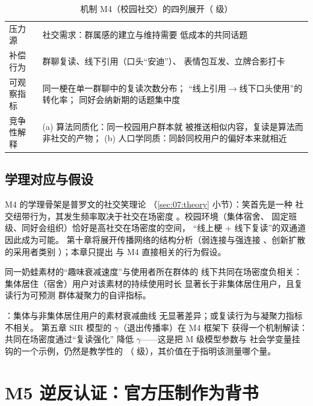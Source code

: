 \begin{table}[htbp]\centering
  \caption{机制 M4（校园社交）的四列展开（ 级）}
  \label{tab:07:m4}
  \small
  \begin{tabularx}{\textwidth}{@{}lX@{}}
    \toprule
    压力源 & 社交需求：群属感的建立与维持需要
      低成本的共同话题 \\
    补偿行为 & 群聊复读、线下引用（口头“安迪”）、
      表情包互发、立牌合影打卡 \\
    可观察指标 & 同一梗在单一群聊中的复读次数分布；
      “线上引用$\to$线下口头使用”的转化率；
      同好会纳新期的话题集中度 \\
    竞争性解释 & (a) 算法同质化：同一校园用户群本就
      被推送相似内容，复读是算法而非社交的产物；
      (b) 人口学同质：同龄同校用户的偏好本来就相近 \\
    \bottomrule
  \end{tabularx}
\end{table}

\subsection{学理对应与假设}

M4 的学理骨架是普罗文的社交笑理论
（\ref{sec:07:theory} 小节）：笑首先是一种
社交纽带行为，其发生频率取决于社交在场密度
\cite{provine2000laughter}。校园环境（集体宿舍、
固定班级、同好会组织）恰好是高社交在场密度的空间，
“线上梗 + 线下复读”的双通道因此成为可能。
第十章将展开传播网络的结构分析（弱连接与强连接
\cite{granovetter1973weak}、创新扩散的采用者类别
\cite{rogers2003diffusion}）；本章只提出
与 M4 直接相关的行为假设。

\begin{hypothesis}[H7.4 校园社交假设]\label{hyp:07:m4}
  同一奶蛙素材的“趣味衰减速度”与使用者所在群体的
  线下共同在场密度负相关：
  集体居住（宿舍）用户对该素材的持续使用时长
  显著长于非集体居住用户，且复读行为可预测
  群体凝聚力的自评指标。
\end{hypothesis}

：集体与非集体居住用户的素材衰减曲线
无显著差异；或复读行为与凝聚力指标不相关。
第五章 SIR 模型的 $\gamma$（退出传播率）在 M4 框架下
获得一个机制解读：共同在场密度通过“复读强化”
降低 $\gamma$——这是把 M 级模型参数与
社会学变量挂钩的一个示例，仍然是教学性的
（ 级），其价值在于指明该测量哪个量。

\section{M5 逆反认证：官方压制作为背书}\label{sec:07:reverse}

